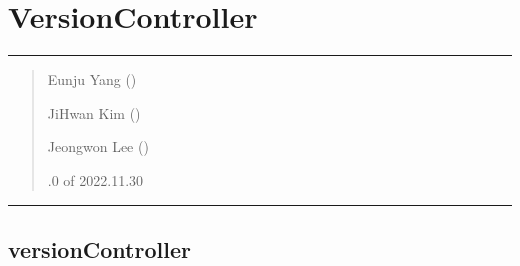 \documentclass[a4paper,10pt,english]{sphinxmanual}
\begin{document}
\sphinxstepscope


\section{VersionController}
\label{\detokenize{_VersionController:versioncontroller}}\label{\detokenize{_VersionController:id1}}\label{\detokenize{_VersionController::doc}}

\bigskip\hrule\bigskip

\begin{quote}\begin{description}
\begin{DUlineblock}{0em}
\item[] Eunju Yang ()
\item[] JiHwan Kim ()
\item[] Jeongwon Lee ()
\end{DUlineblock}

.0 of 2022.11.30

\end{description}\end{quote}


\bigskip\hrule\bigskip



\subsection{versionController}
\label{\detokenize{_VersionController:id2}}
\end{document}
